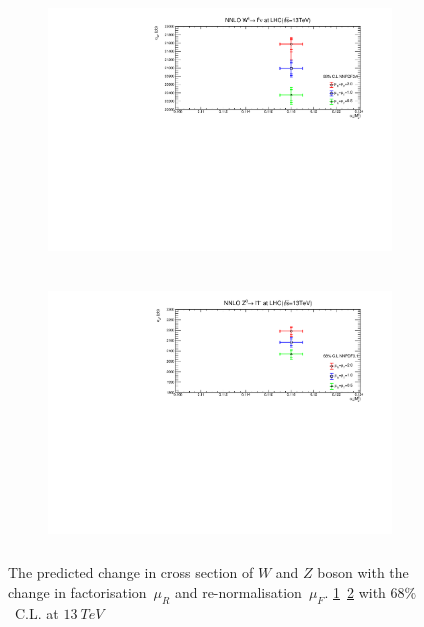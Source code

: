 \begin{figure}[H]
\centering
\begin{subfigure}{0.8\textwidth}
\includegraphics[height=7cm ,width=\textwidth]{chapter4/Comp13_68.pdf}
\vspace*{-8mm}
\caption{}
\label{rfw}
\end{subfigure}
\begin{subfigure}{0.8\textwidth}
\includegraphics[height=7cm, width=\textwidth]{chapter4/CompZ13_68.pdf}
\vspace*{-8mm}
\caption{}
\label{rfz}
\end{subfigure}
\caption{The predicted change in cross section of $W$ and $Z$ boson with the change in factorisation~$\mu_{R}$ and re-normalisation~$\mu_{F}$. \ref{rfw}~\ref{rfz} with $68\%$~C.L. at $13~TeV$ } 
\label{comp}
\end{figure}


